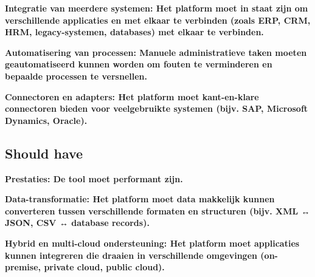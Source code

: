\vspace{\baselineskip}

\textbf{Integratie van meerdere systemen: Het platform moet in staat zijn om verschillende applicaties en met elkaar te verbinden (zoals ERP, CRM, HRM, legacy-systemen, databases) met elkaar te verbinden.}

\vspace{\baselineskip}



\vspace{\baselineskip}

\textbf{Automatisering van processen: Manuele administratieve taken moeten geautomatiseerd kunnen worden om fouten te verminderen en bepaalde processen te versnellen.}

\vspace{\baselineskip}



\vspace{\baselineskip}

\textbf{Connectoren en adapters: Het platform moet kant-en-klare connectoren bieden voor veelgebruikte systemen (bijv. SAP, Microsoft Dynamics, Oracle).}

\vspace{\baselineskip}



\subsection{Should have}%
\label{ShouldHaveMicrosoft}

\textbf{Prestaties: De tool moet performant zijn.}

\vspace{\baselineskip}



\vspace{\baselineskip}

\textbf{Data-transformatie: Het platform moet data makkelijk kunnen converteren tussen verschillende formaten en structuren (bijv. XML ↔ JSON, CSV ↔ database records).}

\vspace{\baselineskip}



\vspace{\baselineskip}

\textbf{Hybrid en multi-cloud ondersteuning: Het platform moet applicaties kunnen integreren die draaien in verschillende omgevingen (on-premise, private cloud, public cloud).}

